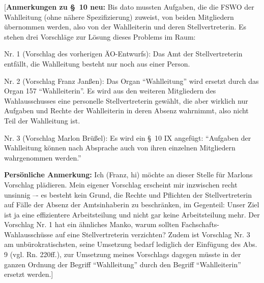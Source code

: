 \documentclass[%
draft,%
multilinesections%
]{fswo}
\newcommand\bemFr[1] {{\color{Red}[#1]}}
\newcommand\bemFr[1]{}%
\begin{document}
\bemFr{\textbf{Anmerkungen zu \S~10 neu:}
Bis dato mussten Aufgaben, die die FSWO der Wahlleitung (ohne nähere Spezifizierung) zuweist, von beiden Mitgliedern übernommen werden, also von der Wahlleiterin und deren Stellvertreterin.
Es stehen drei Vorschläge zur Lösung dieses Problems im Raum:

Nr. 1 (Vorschlag des vorherigen ÄO-Entwurfs):
Das Amt der Stellvertreterin entfällt, die Wahlleitung besteht nur noch aus einer Person.

Nr. 2 (Vorschlag Franz Janßen):
Das Organ \enquote{Wahlleitung} wird ersetzt durch das Organ 157 \enquote{Wahlleiterin}.
Es wird aus den weiteren Mitgliedern des Wahlausschusses eine personelle Stellvertreterin gewählt,
die aber wirklich nur Aufgaben und Rechte der Wahlleiterin in deren Absenz wahrnimmt, also nicht Teil der Wahlleitung ist.

Nr. 3 (Vorschlag Marlon Brüßel):
Es wird ein \S~10 IX angefügt: \enquote{Aufgaben der Wahlleitung können nach Absprache auch von ihren einzelnen Mitgliedern wahrgenommen werden.}

\textbf{Persönliche Anmerkung:} Ich (Franz, hi) möchte an dieser Stelle für Marlons Vorschlag plädieren.
Mein eigener Vorschlag erscheint mir inzwischen recht unsinnig –- es besteht kein Grund,
die Rechte und Pflichten der Stellvertreterin auf Fälle der Absenz der Amtsinhaberin zu beschränken, im Gegenteil:
Unser Ziel ist ja eine effizientere Arbeitsteilung und nicht gar keine Arbeitsteilung mehr.
Der Vorschlag Nr. 1 hat ein ähnliches Manko, warum sollten Fachschafts-Wahlausschüsse auf eine Stellvertreterin verzichten?
Zudem ist Vorschlag Nr. 3 am unbürokratischsten, seine Umsetzung bedarf lediglich der Einfügung des Abs. 9 (vgl. Rn. 220ff.),
zur Umsetzung meines Vorschlags dagegen müsste in der ganzen Ordnung der Begriff \enquote{Wahlleitung} durch den Begriff \enquote{Wahlleiterin} ersetzt werden.}
\end{document}
